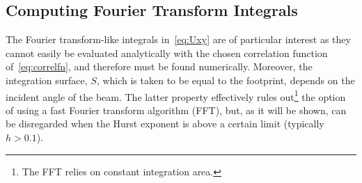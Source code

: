 \documentclass[10pt,twoside, b5paper,pdftex]{report}
\begin{document}
\subsection{Computing Fourier Transform Integrals \label{sec:CFTI}}
The Fourier transform-like integrals in~\cref{eq:Uxy} are of particular interest as they cannot easily be evaluated analytically with the chosen correlation function of~\cref{eq:correlfn}, and therefore must  be found numerically. Moreover, the integration surface, $S$, which is taken to be equal to the footprint, depends on the incident angle of the beam. The latter property effectively rules out\footnote{The FFT relies on constant integration area.} the option of using a fast Fourier transform algorithm (FFT), but, as it will be shown, can be disregarded when the Hurst exponent is above a certain limit  (typically $h > 0.1$).
\end{document}
